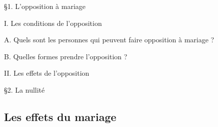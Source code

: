 \documentclass[12pt, a4paper, openany]{book}
\begin{document}
§1. L'opposition à mariage


I. Les conditions de l'opposition


A. Quels sont les personnes qui peuvent faire opposition à mariage ?









B. Quelles formes prendre l'opposition ?









II. Les effets de l'opposition



§2. La nullité







\subsection{Les effets du mariage}
\end{document}
